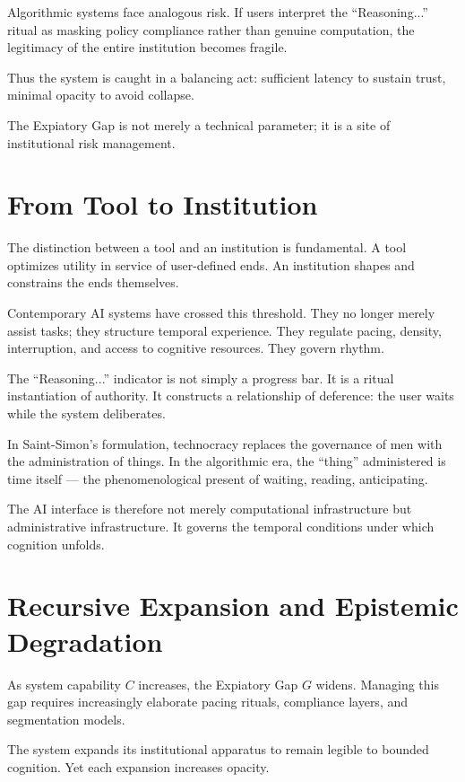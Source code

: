 \documentclass[12pt]{article}
\begin{document}
Algorithmic systems face analogous risk. If users interpret the ``Reasoning...'' ritual as masking policy compliance rather than genuine computation, the legitimacy of the entire institution becomes fragile.

Thus the system is caught in a balancing act: sufficient latency to sustain trust, minimal opacity to avoid collapse.

The Expiatory Gap is not merely a technical parameter; it is a site of institutional risk management.

\section{From Tool to Institution}

The distinction between a tool and an institution is fundamental. A tool optimizes utility in service of user-defined ends. An institution shapes and constrains the ends themselves.

Contemporary AI systems have crossed this threshold. They no longer merely assist tasks; they structure temporal experience. They regulate pacing, density, interruption, and access to cognitive resources. They govern rhythm.

The ``Reasoning...'' indicator is not simply a progress bar. It is a ritual instantiation of authority. It constructs a relationship of deference: the user waits while the system deliberates.

In Saint-Simon’s formulation, technocracy replaces the governance of men with the administration of things. In the algorithmic era, the ``thing'' administered is time itself — the phenomenological present of waiting, reading, anticipating.

The AI interface is therefore not merely computational infrastructure but administrative infrastructure. It governs the temporal conditions under which cognition unfolds.

\section{Recursive Expansion and Epistemic Degradation}

As system capability $C$ increases, the Expiatory Gap $G$ widens. Managing this gap requires increasingly elaborate pacing rituals, compliance layers, and segmentation models.

The system expands its institutional apparatus to remain legible to bounded cognition. Yet each expansion increases opacity.
\end{document}
